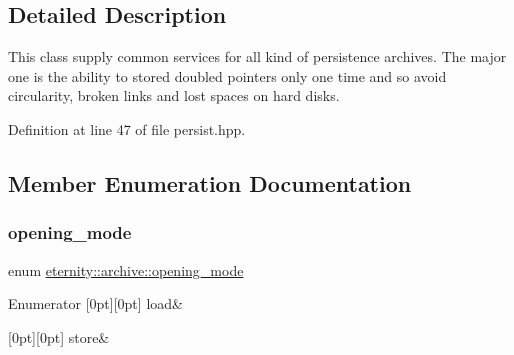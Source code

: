 \subsection{Detailed Description}
This class supply common services for all kind of persistence archives. The major one is the ability to stored doubled pointers only one time and so avoid circularity, broken links and lost spaces on hard disks. 

Definition at line 47 of file persist.\+hpp.



\subsection{Member Enumeration Documentation}
\mbox{\label{classeternity_1_1archive_a8881f9ce8dbed2ee600c64b7925afef0}} 
\subsubsection{\texorpdfstring{opening\+\_\+mode}{opening\_mode}}
{\footnotesize\ttfamily enum \hyperlink{classeternity_1_1archive_a8881f9ce8dbed2ee600c64b7925afef0}{eternity\+::archive\+::opening\+\_\+mode}}

\begin{DoxyEnumFields}{Enumerator}
[0pt][0pt]{}\mbox{\label{classeternity_1_1archive_a8881f9ce8dbed2ee600c64b7925afef0a5b952c27ebe4ca2612e939a1aa19baf5}} 
load&\\
\hline

[0pt][0pt]{}\mbox{\label{classeternity_1_1archive_a8881f9ce8dbed2ee600c64b7925afef0a06c18c297779389cb1cb03a2a7590ca8}} 
store&\\
\hline

\end{DoxyEnumFields}


